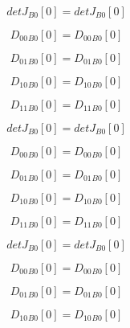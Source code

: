 \documentclass{article}
\begin{document}
\begin{dmath}{detJ{_{B0}}}[{0}] = {detJ{_{B0}}}[{0}]\end{dmath}

\begin{dmath}{D_{00}{_{B0}}}[{0}] = {D_{00}{_{B0}}}[{0}]\end{dmath}

\begin{dmath}{D_{01}{_{B0}}}[{0}] = {D_{01}{_{B0}}}[{0}]\end{dmath}

\begin{dmath}{D_{10}{_{B0}}}[{0}] = {D_{10}{_{B0}}}[{0}]\end{dmath}

\begin{dmath}{D_{11}{_{B0}}}[{0}] = {D_{11}{_{B0}}}[{0}]\end{dmath}

\begin{dmath}{detJ{_{B0}}}[{0}] = {detJ{_{B0}}}[{0}]\end{dmath}

\begin{dmath}{D_{00}{_{B0}}}[{0}] = {D_{00}{_{B0}}}[{0}]\end{dmath}

\begin{dmath}{D_{01}{_{B0}}}[{0}] = {D_{01}{_{B0}}}[{0}]\end{dmath}

\begin{dmath}{D_{10}{_{B0}}}[{0}] = {D_{10}{_{B0}}}[{0}]\end{dmath}

\begin{dmath}{D_{11}{_{B0}}}[{0}] = {D_{11}{_{B0}}}[{0}]\end{dmath}

\begin{dmath}{detJ{_{B0}}}[{0}] = {detJ{_{B0}}}[{0}]\end{dmath}

\begin{dmath}{D_{00}{_{B0}}}[{0}] = {D_{00}{_{B0}}}[{0}]\end{dmath}

\begin{dmath}{D_{01}{_{B0}}}[{0}] = {D_{01}{_{B0}}}[{0}]\end{dmath}

\begin{dmath}{D_{10}{_{B0}}}[{0}] = {D_{10}{_{B0}}}[{0}]\end{dmath}
\end{document}
